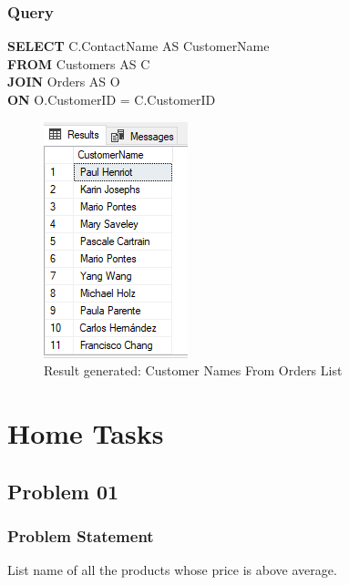 \documentclass[12pt,a4paper]{report}
\begin{document}
\subsubsection{Query}
\begin{center}
	\begin{minipage}{12cm}
		\textbf{SELECT} C.ContactName AS CustomerName \\
		\textbf{FROM}  Customers AS C\\
		\textbf{JOIN} Orders AS O \\
		\textbf{ON} O.CustomerID = C.CustomerID
	\end{minipage}
	\begin{figure}[h]
	\centering
		\includegraphics[scale=0.7]{images/6.png}
		\caption{Result generated: Customer Names From Orders List}
	\end{figure}
\end{center}

\section{Home Tasks}
\subsection{Problem 01}
\subsubsection{Problem Statement}
List name of all the products whose price is above average. 
\end{document}
